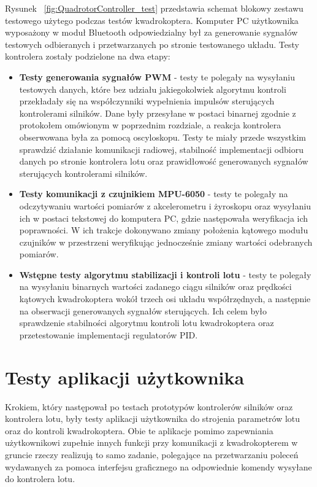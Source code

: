 Rysunek ~\ref{fig:QuadrotorController_test} przedstawia schemat blokowy zestawu testowego użytego podczas testów kwadrokoptera. Komputer PC użytkownika wyposażony w moduł Bluetooth odpowiedzialny był za generowanie sygnałów testowych odbieranych i przetwarzanych po stronie testowanego układu. Testy kontrolera zostały podzielone na dwa etapy:
\begin{itemize}
	\item \textbf{Testy generowania sygnałów PWM} - testy te polegały na wysyłaniu testowych danych, które bez udziału jakiegokolwiek algorytmu kontroli przekładały się na współczynniki wypełnienia impulsów sterujących kontrolerami silników. Dane były przesyłane w postaci binarnej zgodnie z protokołem omówionym w poprzednim rozdziale, a reakcja kontrolera obserwowana była za pomocą oscyloskopu. Testy te miały przede wszystkim sprawdzić działanie komunikacji radiowej, stabilność implementacji odbioru danych po stronie kontrolera lotu oraz prawidłowość generowanych sygnałów sterujących kontrolerami silników.
	\item \textbf{Testy komunikacji z czujnikiem MPU-6050} - testy te polegały na odczytywaniu wartości pomiarów z akcelerometru i żyroskopu oraz wysyłaniu ich w postaci tekstowej do komputera PC, gdzie następowała weryfikacja ich poprawności. W ich trakcje dokonywano zmiany położenia kątowego modułu czujników w przestrzeni weryfikując jednocześnie zmiany wartości odebranych pomiarów.  
	\item \textbf{Wstępne testy algorytmu stabilizacji i kontroli lotu} - testy te polegały na wysyłaniu binarnych wartości zadanego ciągu silników oraz prędkości kątowych kwadrokoptera wokół trzech osi układu współrzędnych, a następnie na obserwacji generowanych sygnałów sterujących. Ich celem było sprawdzenie stabilności algorytmu kontroli lotu kwadrokoptera oraz przetestowanie implementacji regulatorów PID.   
\end{itemize}


\section{Testy aplikacji użytkownika}

Krokiem, który następował po testach prototypów kontrolerów silników oraz kontrolera lotu, były testy aplikacji użytkownika do strojenia parametrów lotu oraz do kontroli kwadrokoptera. Obie te aplikacje pomimo zapewniania użytkownikowi zupełnie innych funkcji przy komunikacji z kwadrokopterem w gruncie rzeczy realizują to samo zadanie, polegające na przetwarzaniu poleceń wydawanych za pomoca interfejsu graficznego na odpowiednie komendy wysyłane do kontrolera lotu. 

